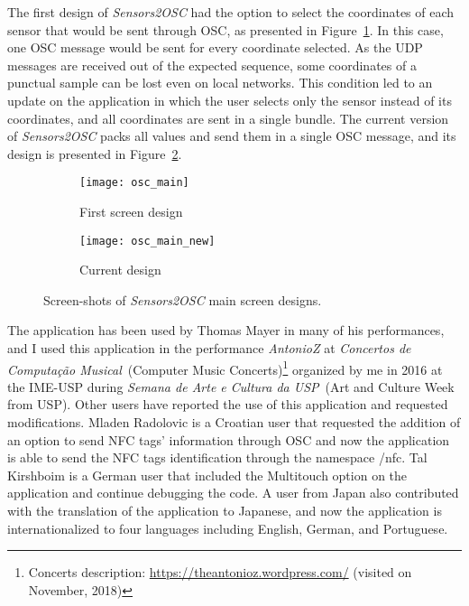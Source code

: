 The first design of \textit{Sensors2OSC} had the option to select the coordinates of each sensor that would be sent through OSC, as presented in Figure~\ref{fig:appsensors2oscfirstdesign}.
In this case, one OSC message would be sent for every coordinate selected.
As the UDP messages are received out of the expected sequence, some coordinates of a punctual sample can be lost even on local networks.
This condition led to an update on the application in which the user selects only the sensor instead of its coordinates, and all coordinates are sent in a single bundle.
The current version of \textit{Sensors2OSC} packs all values and send them in a single OSC message, and its design is presented in Figure~\ref{fig:appsensors2oscseconddesign}.

\begin{figure*}[!ht]
	\centering
	\begin{subfigure}{.30\textwidth}
		\texttt{[image: osc\_main]}
		\caption{First screen design}
		\label{fig:appsensors2oscfirstdesign}
	\end{subfigure}
	\begin{subfigure}{.28\textwidth}
		\texttt{[image: osc\_main\_new]}
		\caption{Current design}
		\label{fig:appsensors2oscseconddesign}
	\end{subfigure}
	
	\caption{Screen-shots of \textit{Sensors2OSC} main screen designs.}
	\label{fig:sensors2oscmainscreen}
\end{figure*}

The application has been used by Thomas Mayer in many of his performances, and I used this application in the performance \textit{AntonioZ} at \textit{Concertos de Computação Musical}~(Computer Music Concerts)\footnote{Concerts description: \url{https://theantonioz.wordpress.com/} (visited on November, 2018)} organized by me in 2016 at the IME-USP during \textit{Semana de Arte e Cultura da USP}~(Art and Culture Week from USP).
Other users have reported the use of this application and requested modifications.
Mladen Radolovic is a Croatian user that requested the addition of an option to send NFC tags' information through OSC and now the application is able to send the NFC tags identification through the namespace /nfc.
Tal Kirshboim is a German user that included the Multitouch option on the application and continue debugging the code.
A user from Japan also contributed with the translation of the application to Japanese, and now the application is internationalized to four languages including English, German, and Portuguese.

